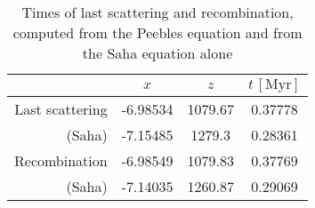 \begin{table}[h]
\centering
\caption{Times of last scattering and recombination, computed from the Peebles equation and from the Saha equation alone}
\label{tab:M2:results:rec_and_dec_time_table}
\begin{tabular}{r|ccc}
\toprule
                &      $x$ &     $z$ & $t\,\mathrm{[Myr]}$ \\
\midrule
Last scattering & -6.98534 & 1079.67 &             0.37778 \\
         (Saha) & -7.15485 &  1279.3 &             0.28361 \\
\midrule\midrule
  Recombination & -6.98549 & 1079.83 &             0.37769 \\
         (Saha) & -7.14035 & 1260.87 &             0.29069 \\
\bottomrule
\end{tabular}
\end{table}